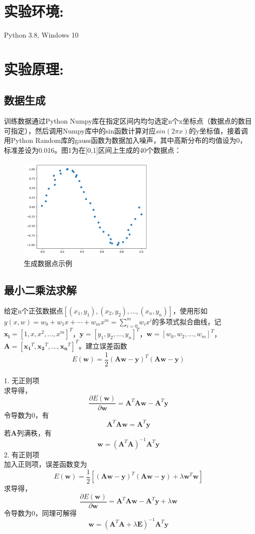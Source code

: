 \documentclass[a4paper,11pt,UTF8]{ctexart}
\newcommand{\bottomcaption}{%
\setlength{\abovecaptionskip}{6pt}%
\setlength{\belowcaptionskip}{6pt}%
\caption}
\begin{document}
\section{实验环境:}

Python 3.8, Windows 10

\section{实验原理:}
\subsection{数据生成}
训练数据通过Python Numpy库在指定区间内均匀选定n个x坐标点（数据点的数目可指定），然后调用Numpy库中的sin函数计算对应$sin(2\pi x)$的y坐标值，接着调用Python Random库的gauss函数为数据加入噪声，其中高斯分布的均值设为0，标准差设为0.016。图1为在[0,1]区间上生成的40个数据点：
\begin{figure}[htbp]
	\centering
	\includegraphics[width=0.6\textwidth]{datademo.png}
	\bottomcaption{生成数据点示例}
\end{figure}

\subsection{最小二乘法求解}
给定n个正弦数据点$[(x_{1},y_{1}), (x_{2}, y_{2}),...,(x_{n}, y_{n})]$，使用形如$y(x, w)=w_{0}+w_{1} x+\cdots+w_{m} x^{m}=\sum_{i=0}^{m} w_{i} x^{i}$的多项式拟合曲线，记
$\bm{x_{i}} = [1, x, x^{2}, ..., x^{m}]^{T}$，$\bm{y} = [y_{1}, y_{2},..., y_{n}]^{T}$，$\bm{w} = [w_{0}, w_{2},..., w_{m}]^{T}$，$\bm{A} = [\bm{x_{1}}^{T}, \bm{x_{2}}^{T},...,\bm{x_{n}}^{T}]^{T}$。建立误差函数$$E(\bm{w}) = \frac{1}{2}(\bm{Aw} - \bm{y}) ^{T}(\bm{Aw} - \bm{y})$$ \\
1. 无正则项 \\
求导得，$$\frac{\partial E(\bm{w})}{\partial \bm{w}} = \bm{A}^{T}\bm{Aw} - \bm{A}^{T}\bm{y}$$
令导数为0，有
$$ \bm{A}^{T}\bm{Aw} = \bm{A}^{T}\bm{y}$$
若$\bm{A}$列满秩，有$$\bm{w} = (\bm{A}^{T}\bm{A})^{-1}\bm{A}^{T}\bm{y}$$
2. 有正则项 \\
加入正则项，误差函数变为
$$E(\bm{w}) = \frac{1}{2}[(\bm{Aw} - \bm{y}) ^{T}(\bm{Aw} - \bm{y}) + \lambda\bm{w}^{T}\bm{w}] $$
求导得，$$\frac{\partial E(\bm{w})}{\partial \bm{w}} = \bm{A}^{T}\bm{Aw} - \bm{A}^{T}\bm{y} + \lambda \bm{w}$$
令导数为0，同理可解得
$$\bm{w} = (\bm{A}^{T}\bm{A} +　\lambda\bm{E})^{-1}\bm{A}^{T}\bm{y}$$
\end{document}
